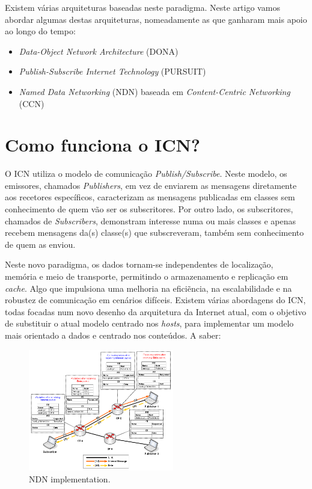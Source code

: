 \documentclass[conference]{IEEEtran}
\begin{document}
Existem v\'{a}rias arquiteturas baseadas neste paradigma. Neste artigo vamos abordar algumas destas arquiteturas, nomeadamente as que ganharam mais apoio ao longo do tempo: 
\begin{itemize}
\item \textit{Data-Object Network Architecture} (DONA)
\item \textit{Publish-Subscribe Internet Technology} (PURSUIT)
\item \textit{Named Data Networking} (NDN) baseada em \textit{Content-Centric Networking} (CCN) 
\end{itemize}



\section{Como funciona o ICN?}

O ICN utiliza o modelo de comunica\c{c}\~{a}o \textit{Publish/Subscribe}. Neste modelo, os emissores, chamados \textit{Publishers}, em vez de enviarem as mensagens diretamente aos recetores espec\'{i}ficos, caracterizam as mensagens publicadas em classes sem conhecimento de quem v\~{a}o ser os subscritores. Por outro lado, os subscritores, chamados de \textit{Subscribers}, demonstram interesse numa ou mais classes e apenas recebem mensagens da(s) classe(s) que subscreveram, tamb\'{e}m sem conhecimento de quem as enviou. %

Neste novo paradigma, os dados tornam-se independentes de localiza\c{c}\~{a}o, mem\'{o}ria e meio de transporte, permitindo o armazenamento e replica\c{c}\~{a}o em \textit{cache}. Algo que impulsiona uma melhoria na efici\~{e}ncia, na escalabilidade e na robustez de comunica\c{c}\~{a}o em cen\'{a}rios dif\'{i}ceis. Existem v\'{a}rias abordagens do ICN, todas focadas num novo desenho da arquitetura da Internet atual, com o objetivo de substituir o atual modelo centrado nos \textit{hosts}, para implementar um modelo mais orientado a dados e centrado nos conte\'{u}dos\cite{surveyICN}. A saber:

\begin{figure}[h]
\centering
\includegraphics[width=2.5in]{ndn}
\caption{NDN implementation.}
\label{dona}
\end{figure}
\end{document}

